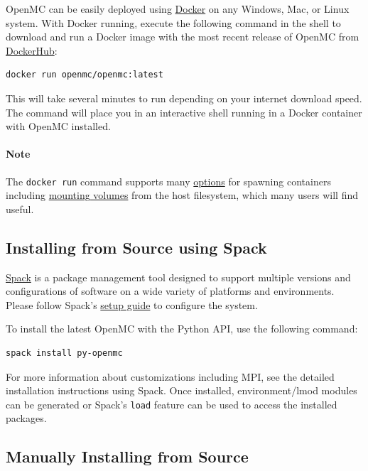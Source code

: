 OpenMC can be easily deployed using \href{https://www.docker.com/}{Docker} on any
Windows, Mac, or Linux system. With Docker running, execute the following command
in the shell to download and run a Docker image with the most recent release
of OpenMC from \href{https://hub.docker.com/}{DockerHub}:

\begin{verbatim}
docker run openmc/openmc:latest
\end{verbatim}

This will take several minutes to run depending on your internet download speed.
The command will place you in an interactive shell running in a Docker
container with OpenMC installed.

\paragraph{Note}
The \texttt{docker run} command supports many \href{https://docs.docker.com/engine/reference/commandline/run/}{options}
for spawning containers including \href{https://docs.docker.com/storage/volumes/}{mounting volumes}
from the host filesystem, which many users will find useful.

\subsection*{Installing from Source using Spack}

\href{https://spack.readthedocs.io/en/latest/}{Spack} is a package management tool designed to support multiple versions and
configurations of software on a wide variety of platforms and environments.
Please follow Spack's \href{https://spack.readthedocs.io/en/latest/getting_started.html}{setup guide} to configure the system.

To install the latest OpenMC with the Python API, use the following command:

\begin{verbatim}
spack install py-openmc
\end{verbatim}

For more information about customizations including MPI, see the detailed installation
instructions using Spack. Once installed, environment/lmod modules can be generated
or Spack's \texttt{load} feature can be used to access the installed packages.

\subsection*{Manually Installing from Source}

